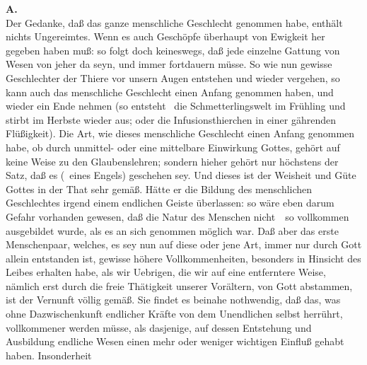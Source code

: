 \vabst \textbf{A.}~\\
Der Gedanke, daß das ganze menschliche Geschlecht 
genommen habe, enthält nichts Ungereimtes. Wenn es auch Geschöpfe überhaupt von Ewigkeit her gegeben haben muß: so folgt doch keineswegs, daß jede einzelne Gattung von Wesen von jeher da seyn, und immer fortdauern müsse. So wie nun gewisse Geschlechter der Thiere vor unsern Augen entstehen und wieder vergehen, so kann auch das menschliche Geschlecht einen Anfang genommen haben, und wieder ein Ende nehmen (so entsteht \zB\ die Schmetterlingswelt im Frühling und stirbt im Herbste wieder aus; oder die Infusionsthierchen in einer gährenden Flüßigkeit). Die Art, wie dieses menschliche Geschlecht einen Anfang genommen habe, ob durch unmittel- oder eine mittelbare Einwirkung Gottes, gehört auf keine Weise zu den Glaubenslehren; sondern hieher gehört nur höchstens der Satz, daß es  (\zB\ eines Engels) geschehen sey. Und dieses ist der Weisheit und Güte Gottes in der That sehr gemäß. Hätte er die Bildung des menschlichen Geschlechtes irgend einem endlichen Geiste überlassen: so wäre eben darum Gefahr vorhanden gewesen, daß die Natur des Menschen nicht~\ so vollkommen ausgebildet wurde, als es an sich genommen möglich war. Daß aber das erste Menschenpaar, welches, es sey nun auf diese oder jene Art, immer nur durch Gott allein entstanden ist, gewisse höhere Vollkommenheiten, besonders in Hinsicht des Leibes erhalten habe, als wir Uebrigen, die wir auf eine entferntere Weise, nämlich erst durch die freie Thätigkeit unserer Vorältern, von Gott abstammen, ist der Vernunft völlig gemäß. Sie findet es beinahe nothwendig, daß das, was ohne Dazwischenkunft endlicher Kräfte von dem Unendlichen selbst herrührt, vollkommener werden müsse, als dasjenige, auf dessen Entstehung und Ausbildung endliche Wesen einen mehr oder weniger wichtigen Einfluß gehabt haben. Insonderheit

